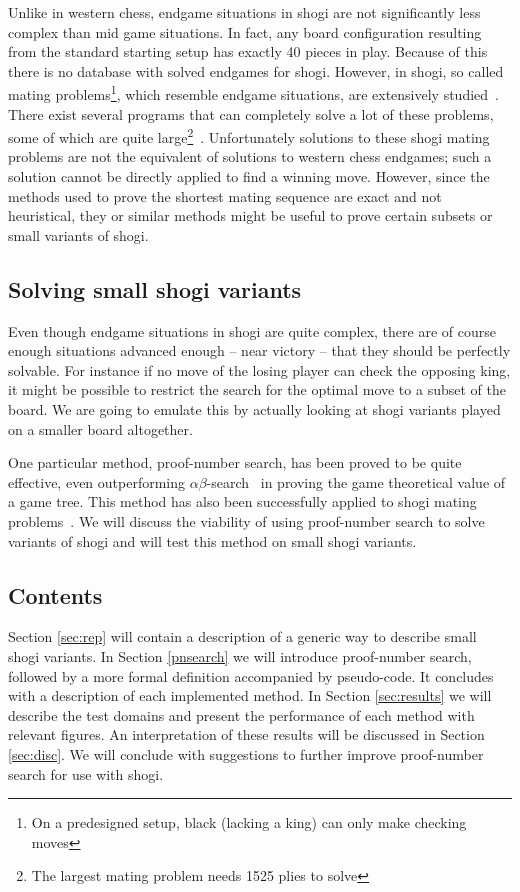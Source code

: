 \documentclass[a4paper, 11pt]{article}
\begin{document}
Unlike in western chess, endgame situations
in shogi are not significantly less complex than mid game situations. In fact, any board configuration resulting from the standard
starting setup has exactly 40 pieces in play. Because of this there is no database with solved endgames for shogi.
However, in shogi, so called mating problems\footnote{On a predesigned setup, black (lacking a king) can only make checking moves},
which resemble endgame situations, are extensively studied~\cite{grimbergen1999survey}. There exist several
programs that can completely solve a lot of these problems, some of which are quite
large\footnote{The largest mating problem needs 1525 plies to solve}~\cite{seo2001pn}.
Unfortunately solutions to these shogi
mating problems are not the equivalent of solutions to western chess endgames; such a solution cannot be directly applied to find a winning move.
However, since the methods used to prove the shortest mating sequence are exact and not heuristical, they or similar methods might be useful to prove
certain subsets or small variants of shogi.\\

\subsection{Solving small shogi variants}
Even though endgame situations in shogi are quite complex, there are of course enough situations advanced enough -- near victory -- that they
should be perfectly solvable. For instance if no move of the losing player can check the opposing king, it might be possible to restrict the search
for the optimal move to a subset of the board. We are going to emulate this by actually looking at shogi variants played on a smaller board
altogether.

One particular method, proof-number search, has been proved to be quite effective, even outperforming $\alpha\beta$-search~\cite{van2008proof} in
proving the game theoretical value of a game tree. This method has also been successfully applied to shogi mating
problems~\cite{seo2001pn, ueda2008weak, sakuta2001performance}. We will discuss the viability of using proof-number search to solve variants of shogi and will test
this method on small shogi variants.

\subsection{Contents}
Section \ref{sec:rep} will contain a description of a generic way to describe small shogi variants. In Section \ref{pnsearch} we will introduce proof-number
search, followed by a more formal definition accompanied by pseudo-code. It concludes with a description of each implemented method.
In Section \ref{sec:results} we will describe the test domains and present the performance of each method with relevant figures.
An interpretation of these results will be discussed in Section \ref{sec:disc}. We will conclude with suggestions to further improve
proof-number search for use with shogi.
\end{document}
